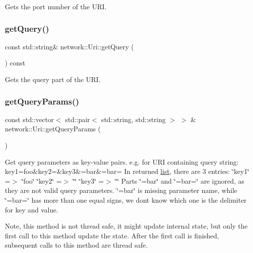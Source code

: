 Gets the port number of the U\+RI. \mbox{\label{classnetwork_1_1Uri_a846ce329ccfca7a0d8d87057bb6cf1eb}} 
\subsubsection{\texorpdfstring{get\+Query()}{getQuery()}}
{\footnotesize\ttfamily const std\+::string\& network\+::\+Uri\+::get\+Query (\begin{DoxyParamCaption}{ }\end{DoxyParamCaption}) const\hspace{0.3cm}{\ttfamily [inline]}}

Gets the query part of the U\+RI. \mbox{\label{classnetwork_1_1Uri_aa546a407e803754b573bbe5c13e28d77}} 
\subsubsection{\texorpdfstring{get\+Query\+Params()}{getQueryParams()}}
{\footnotesize\ttfamily const std\+::vector$<$ std\+::pair$<$ std\+::string, std\+::string $>$ $>$ \& network\+::\+Uri\+::get\+Query\+Params (\begin{DoxyParamCaption}{ }\end{DoxyParamCaption})}

Get query parameters as key-\/value pairs. e.\+g. for U\+RI containing query string\+: key1=foo\&key2=\&key3\&=bar\&=bar= In returned \hyperlink{protocollist-p}{list}, there are 3 entries\+: \char`\"{}key1\char`\"{} =$>$ \char`\"{}foo\char`\"{} \char`\"{}key2\char`\"{} =$>$ \char`\"{}\char`\"{} \char`\"{}key3\char`\"{} =$>$ \char`\"{}\char`\"{} Parts \char`\"{}=bar\char`\"{} and \char`\"{}=bar=\char`\"{} are ignored, as they are not valid query parameters. \char`\"{}=bar\char`\"{} is missing parameter name, while \char`\"{}=bar=\char`\"{} has more than one equal signs, we don\textquotesingle{}t know which one is the delimiter for key and value.

Note, this method is not thread safe, it might update internal state, but only the first call to this method update the state. After the first call is finished, subsequent calls to this method are thread safe.

